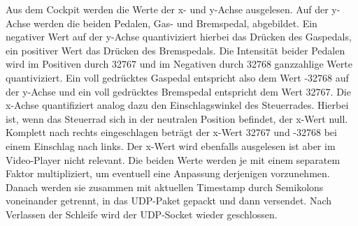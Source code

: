 Aus dem Cockpit werden die Werte der x- und y-Achse ausgelesen. Auf der y-Achse werden die beiden Pedalen, Gas- und Bremspedal, abgebildet. Ein negativer Wert auf der y-Achse quantiviziert hierbei das Drücken des Gaspedals, ein positiver Wert das Drücken des Bremspedals. Die Intensität beider Pedalen wird im Positiven durch 32767 und im Negativen durch 32768 ganzzahlige Werte quantiviziert. Ein voll gedrücktes Gaspedal entspricht also dem Wert -32768 auf der y-Achse und ein voll gedrücktes Bremspedal entspricht dem Wert 32767. Die x-Achse quantifiziert analog dazu den Einschlagswinkel des Steuerrades. Hierbei ist, wenn das Steuerrad sich in der neutralen Position befindet, der x-Wert null. Komplett nach rechts eingeschlagen beträgt der x-Wert 32767 und -32768 bei einem Einschlag nach links. Der x-Wert wird ebenfalls ausgelesen ist aber im Video-Player nicht relevant. Die beiden Werte werden je mit einem separatem Faktor multipliziert, um eventuell eine Anpassung derjenigen vorzunehmen. Danach werden sie zusammen mit aktuellen Timestamp durch Semikolons voneinander getrennt, in das UDP-Paket gepackt und dann versendet. Nach Verlassen der Schleife wird der UDP-Socket wieder geschlossen.


